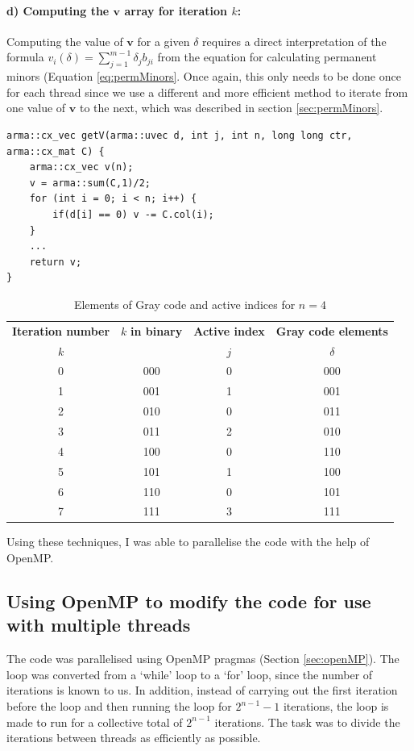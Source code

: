\documentclass[ %
                    author={Manan Vaswani},
                supervisor={Dr. Raphael Clifford},
                    degree={MEng},
                     title={A multi-core CPU implementation of the classical Boson Sampling algorithm},
                  subtitle={},
                      type={},
                      year={2019} ]{dissertation}
\theoremstyle{plain}
\theoremstyle{definition}
\begin{document}
\paragraph{d) Computing the $\mathbf{v}$ array for iteration $k$:} Computing the value of $\mathbf{v}$ for a given $\delta$ requires a direct interpretation of the formula $v_i (\delta) = \sum_{j=1}^{m-1} \delta_j b_{ji}$ from the equation for calculating permanent minors (Equation \ref{eq:permMinors}. Once again, this only needs to be done once for each thread since we use a different and more efficient method to iterate from one value of $\mathbf{v}$ to the next, which was described in section \ref{sec:permMinors}.
\begin{verbatim}
arma::cx_vec getV(arma::uvec d, int j, int n, long long ctr, arma::cx_mat C) {
    arma::cx_vec v(n);
    v = arma::sum(C,1)/2;
    for (int i = 0; i < n; i++) {
        if(d[i] == 0) v -= C.col(i);
    }
    ...
    return v;
}
\end{verbatim}

\begin{table}
  \begin{center}
    \caption{Elements of Gray code and active indices for $n = 4$}
    \label{tab:graycode}
    \begin{tabular}{|c|c|c|c|}
    \hline
      \textbf{Iteration number} & $k$ \textbf{in binary} & \textbf{Active index} & \textbf{Gray code elements}\\
      $k$ & & $j$ & $\delta$\\
      \hline
      0 & 000 & 0 & 000 \\
      1 & 001 & 1 & 001 \\
      2 & 010 & 0 & 011 \\
      3 & 011 & 2 & 010 \\
      4 & 100 & 0 & 110 \\
      5 & 101 & 1 & 100 \\
      6 & 110 & 0 & 101 \\
      7 & 111 & 3 & 111 \\
      \hline
    \end{tabular}
  \end{center}
\end{table}

Using these techniques, I was able to parallelise the code with the help of OpenMP.

\subsection{Using OpenMP to modify the code for use with multiple threads}
The code was parallelised using OpenMP pragmas (Section \ref{sec:openMP}). The loop was converted from a `while' loop to a `for' loop, since the number of iterations is known to us. In addition, instead of carrying out the first iteration before the loop and then running the loop for $2^{n-1} -1$ iterations, the loop is made to run for a collective total of $2^{n-1}$ iterations. The task was to divide the iterations between threads as efficiently as possible.
\end{document}
